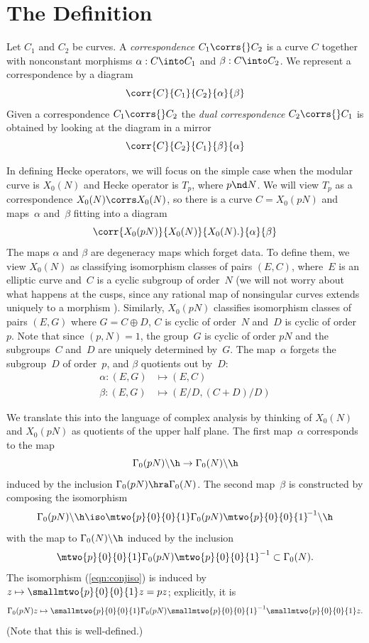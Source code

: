 \documentclass{report}
\begin{document}
\section{The Definition}\label{sec:defn_hecke_corr}

\begin{definition}[Correspondence]
Let $C_1$ and $C_2$ be curves. A {\em correspondence}
$C_1\corrs{}C_2$ is a curve $C$ together with nonconstant morphisms
$\alpha:C\into C_1$ and $\beta:C\into C_2$.  We represent a
correspondence by a diagram
\[
  \corr{C}{C_1}{C_2}{\alpha}{\beta}
\]
Given a correspondence $C_1\corrs{}C_2$ the {\em dual
correspondence} $C_2\corrs{}C_1$ is obtained by looking at the
diagram in a mirror
\[
  \corr{C}{C_2}{C_1}{\beta}{\alpha}
\]
\end{definition}

In defining Hecke operators, we will focus on the simple case when
the modular curve is $X_0(N)$ and Hecke operator is $T_p$, where
$p\nd N$.  We will view $T_p$ as a correspondence $X_0(N)\corrs
X_0(N)$, so there is a curve $C=X_0(pN)$ and maps~$\alpha$
and~$\beta$ fitting into a diagram
\[
  \corr{X_0(pN)}{X_0(N)}{X_0(N).}{\alpha}{\beta}
\]
The maps $\alpha$ and $\beta$ are degeneracy maps which forget
data. To define them, we view $X_0(N)$ as classifying isomorphism
classes of pairs $(E,C)$, where~$E$ is an elliptic curve and~$C$
is a cyclic subgroup of order~$N$ (we will not worry about what
happens at the cusps, since any rational map of nonsingular curves
extends uniquely to a morphism \cite[Ch.~I, Prop.~6.8]{hartshorne}). Similarly, $X_0(pN)$ classifies
isomorphism classes of pairs $(E,G)$ where $G=C\oplus{}D$, $C$ is
cyclic of order~$N$ and~$D$ is cyclic of order~$p$. Note that
since $(p,N)=1$, the group~$G$ is cyclic of order $pN$ and the
subgroups~$C$ and~$D$ are uniquely determined by~$G$. The
map~$\alpha$ forgets the subgroup~$D$ of order~$p$, and $\beta$
quotients out by~$D$:
\begin{align}\label{eqn:alphabeta}
  \alpha:(E,G)&\mapsto(E,C)\\
  \beta:(E,G)&\mapsto(E/D,(C+D)/D)
\end{align}

We translate this into the language of complex analysis by
thinking of $X_0(N)$ and $X_0(pN)$ as quotients of the upper half
plane. The first map~$\alpha$ corresponds to the map
\[
   \Gamma_0(pN)\backslash\h \to \Gamma_0(N)\backslash\h
\]
induced by the inclusion $\Gamma_0(pN) \hra \Gamma_0(N)$. The
second map~$\beta$ is constructed by composing the isomorphism
\begin{equation}\label{eqn:conjiso}
  \Gamma_0(pN)\backslash\h\iso
  \mtwo{p}{0}{0}{1}
   \Gamma_0(pN)
   \mtwo{p}{0}{0}{1}^{\!-1}
  \backslash\h
\end{equation}
with the map to $\Gamma_0(N)\backslash\h$ induced
by the inclusion
\[
 \mtwo{p}{0}{0}{1}
   \Gamma_0(pN)
  \mtwo{p}{0}{0}{1}^{-1} \subset \Gamma_0(N).
\]
The isomorphism (\ref{eqn:conjiso}) is induced by $z\mapsto
\smallmtwo{p}{0}{0}{1}z = pz$; explicitly, it is
\[
\Gamma_0(pN)z\mapsto \smallmtwo{p}{0}{0}{1}\Gamma_0(pN)
\smallmtwo{p}{0}{0}{1}^{-1}\smallmtwo{p}{0}{0}{1}z.
\]
(Note that this is well-defined.)
\end{document}

